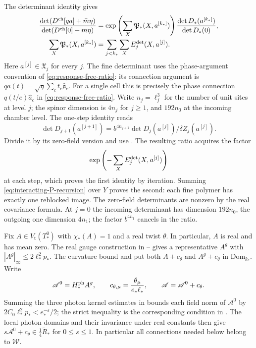 The determinant identity
\cite[(33)]{NonlinearStep} gives
\begin{align}
 \frac{\det(D^{\rm ch}[qa]+\bar m\eta)}{\det(D^{\rm ch}[0]+\bar m\eta)}
 &=\exp\left(\sum_X\mathfrak P_*(X,a^{[k_*]})\right)
                    \frac{\det D_*(a^{[k_*]})}{\det D_*(0)},
                           \label{eq:interacting-determinant-telescope}\\
 \sum_X\mathfrak P_*(X,a^{[k_*]})
 &=\sum_{j<k_*}\sum_XE_j^{\rm det}(X,a^{[j]}).
                           \label{eq:interacting-P-telescope}
\end{align}
Here $a^{[j]}\in\mathfrak X_j$ for every $j$.
The fine determinant uses the phase-argument convention
of \eqref{eq:response-free-ratio}: its connection argument
is $qa(t)=\sqrt\eta\sum_ct_c\widehat{\mathfrak a}_c$.
For a single cell this is precisely the phase connection
$q(t/e)\widehat a_c$ in \eqref{eq:response-free-ratio}.
Write $n_j=\ell_j^3$ for the number of unit sites at level $j$;
the spinor dimension is $4n_j$ for $j\ge1$, and $192n_0$
at the incoming chamber level. The one-step identity reads
\[
 \det D_{j+1}(a^{[j+1]})
       =b^{4n_{j+1}}\det D_j(a^{[j]})/\delta Z_j(a^{[j]}).
\]
Divide it by its zero-field version and use
\cite[(78)]{FermionBlock}. The resulting
ratio acquires the factor
\[
 \exp\left(-\sum_XE_j^{\rm det}(X,a^{[j]})\right)
\]
at each
step, which proves the first identity by iteration.
Summing \eqref{eq:interacting-P-recursion} over $Y$
proves the second: each fine polymer has exactly
one reblocked image. The zero-field determinants
are nonzero by the real covariance formula.
At $j=0$ the incoming determinant has dimension
$192n_0$, the outgoing one dimension $4n_1$;
the factor $b^{4n_1}$ cancels in the ratio.

Fix $A\in V_{\mathrm t}(T_*^0)$ with $\chi_*(A)=1$
and a real twist $\theta$. In particular, $A$ is real and has mean zero.
The real gauge construction in
\cite[(32)]{MaxwellBlock}--%
\cite[(33)]{MaxwellBlock}
gives a representative $A^g$ with
$|A^g|_\infty\le2\ell_*^2p_*$.
The curvature bound and
\cite[Theorem~B]{MaxwellBlock}
put both $A+c_\theta$ and $A^g+c_\theta$
in $\mathrm{Dom}_{k_*}$.
Write
\[
 \mathscr A^0=H_*^{\rm ph}A^g,\qquad
 c_{\theta,\mu}=\frac{\theta_\mu}{e_*\ell_*},
 \qquad \mathscr A=\mathscr A^0+c_\theta.
\]
Summing the three photon kernel estimates in
\cite[(14)]{MaxwellBlock} bounds each
field norm of $\mathscr A^0$ by
$2C_0\ell_*^2p_*<e_*^{-\varepsilon}/2$;
the strict inequality is the corresponding
condition in \cite[(43)]{TerminalPressure}.
The local photon domains and their invariance
under real constants then give
$s\mathscr A^0+c_\theta\in\frac14\widetilde R_*$
for $0\le s\le1$. In particular all
connections needed below belong to $\mathcal W$.

